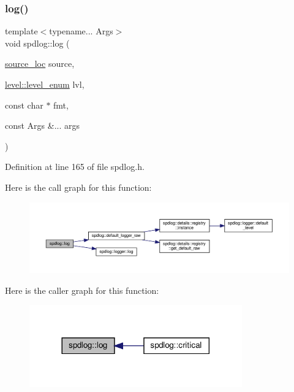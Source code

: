\subsubsection{\texorpdfstring{log()}{log()}\hspace{0.1cm}{\footnotesize\ttfamily [1/3]}}
{\footnotesize\ttfamily template$<$typename... Args$>$ \\
void spdlog\+::log (\begin{DoxyParamCaption}\item[{\hyperlink{structspdlog_1_1source__loc}{source\+\_\+loc}}]{source,  }\item[{\hyperlink{namespacespdlog_1_1level_a35f5227e5daf228d28a207b7b2aefc8b}{level\+::level\+\_\+enum}}]{lvl,  }\item[{const char $\ast$}]{fmt,  }\item[{const Args \&...}]{args }\end{DoxyParamCaption})\hspace{0.3cm}{\ttfamily [inline]}}



Definition at line 165 of file spdlog.\+h.

Here is the call graph for this function\+:
\nopagebreak
\begin{figure}[H]
\begin{center}
\leavevmode
\includegraphics[width=350pt]{namespacespdlog_acc4ad5305b408c41a60540b0e2a8aa85_cgraph}
\end{center}
\end{figure}
Here is the caller graph for this function\+:
\nopagebreak
\begin{figure}[H]
\begin{center}
\leavevmode
\includegraphics[width=260pt]{namespacespdlog_acc4ad5305b408c41a60540b0e2a8aa85_icgraph}
\end{center}
\end{figure}
\mbox{\label{namespacespdlog_a7ad1ad069c196a042cb191b05d27167a}} 
